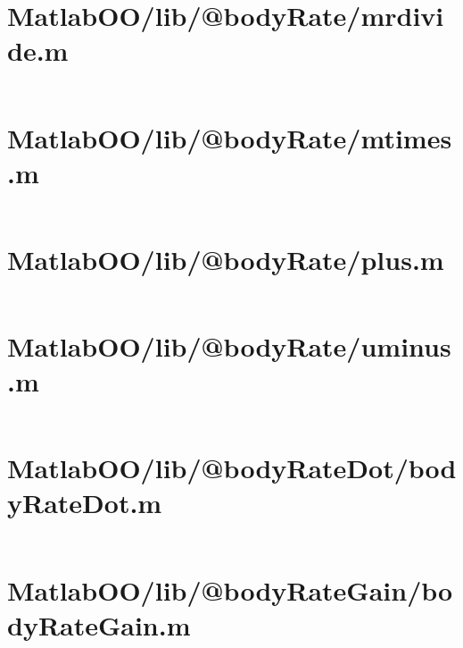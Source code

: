 \pagebreak
\section*{MatlabOO/lib/@bodyRate/mrdivide.m}\label{code:MatlabOO/lib/@bodyRate/mrdivide.m}
\inputminted[linenos,fontsize=\scriptsize]{matlab}{/home/dcouture/git/mathyourlife/TSatPy/beta_versions/matlab_object_oriented/lib/@bodyRate/mrdivide.m}

\pagebreak
\section*{MatlabOO/lib/@bodyRate/mtimes.m}\label{code:MatlabOO/lib/@bodyRate/mtimes.m}
\inputminted[linenos,fontsize=\scriptsize]{matlab}{/home/dcouture/git/mathyourlife/TSatPy/beta_versions/matlab_object_oriented/lib/@bodyRate/mtimes.m}

\pagebreak
\section*{MatlabOO/lib/@bodyRate/plus.m}\label{code:MatlabOO/lib/@bodyRate/plus.m}
\inputminted[linenos,fontsize=\scriptsize]{matlab}{/home/dcouture/git/mathyourlife/TSatPy/beta_versions/matlab_object_oriented/lib/@bodyRate/plus.m}

\pagebreak
\section*{MatlabOO/lib/@bodyRate/uminus.m}\label{code:MatlabOO/lib/@bodyRate/uminus.m}
\inputminted[linenos,fontsize=\scriptsize]{matlab}{/home/dcouture/git/mathyourlife/TSatPy/beta_versions/matlab_object_oriented/lib/@bodyRate/uminus.m}

\pagebreak
\section*{MatlabOO/lib/@bodyRateDot/bodyRateDot.m}\label{code:MatlabOO/lib/@bodyRateDot/bodyRateDot.m}
\inputminted[linenos,fontsize=\scriptsize]{matlab}{/home/dcouture/git/mathyourlife/TSatPy/beta_versions/matlab_object_oriented/lib/@bodyRateDot/bodyRateDot.m}

\pagebreak
\section*{MatlabOO/lib/@bodyRateGain/bodyRateGain.m}\label{code:MatlabOO/lib/@bodyRateGain/bodyRateGain.m}
\inputminted[linenos,fontsize=\scriptsize]{matlab}{/home/dcouture/git/mathyourlife/TSatPy/beta_versions/matlab_object_oriented/lib/@bodyRateGain/bodyRateGain.m}

